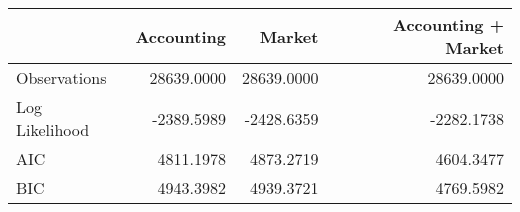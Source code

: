 \begin{tabular}{lrrr}
\toprule
 & Accounting & Market & Accounting + Market \\
\midrule
Observations & 28639.0000 & 28639.0000 & 28639.0000 \\
Log Likelihood & -2389.5989 & -2428.6359 & -2282.1738 \\
AIC & 4811.1978 & 4873.2719 & 4604.3477 \\
BIC & 4943.3982 & 4939.3721 & 4769.5982 \\
\bottomrule
\end{tabular}
